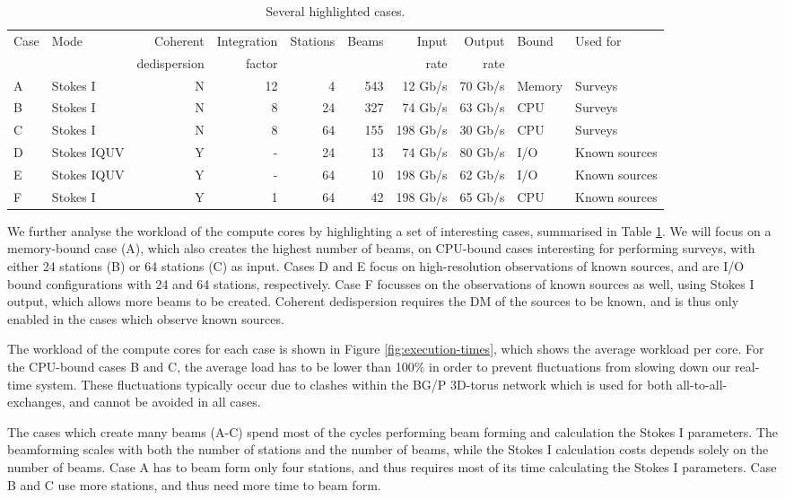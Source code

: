 \documentclass{llncs}
\begin{document}
\begin{table}
\begin{tabular}{l|l|r|r|r|r|r|r|l|l}
Case & Mode & Coherent     & Integration & Stations & Beams  & Input & Output & Bound & Used for \\
     &      & dedispersion & factor      &          &        & rate  & rate   &       & \\
\hline
\hline
A & Stokes I    & N & 12 &  4 & 543 &  12 Gb/s & 70 Gb/s & Memory & Surveys \\
B & Stokes I    & N &  8 & 24 & 327 &  74 Gb/s & 63 Gb/s & CPU   & Surveys \\
C & Stokes I    & N &  8 & 64 & 155 & 198 Gb/s & 30 Gb/s & CPU   & Surveys \\  
D & Stokes IQUV & Y & - & 24 &  13 &  74 Gb/s & 80 Gb/s & I/O   & Known sources \\
E & Stokes IQUV & Y & - & 64 &  10 & 198 Gb/s & 62 Gb/s & I/O   & Known sources \\
F & Stokes I    & Y & 1 & 64 &  42 & 198 Gb/s & 65 Gb/s & CPU   & Known sources 
\end{tabular}
\caption{Several highlighted cases.}
\label{table:cases}
\end{table}

We further analyse the workload of the compute cores by highlighting a set of interesting cases, summarised in Table \ref{table:cases}. We will focus on a memory-bound case (A), which also creates the highest number of beams, on CPU-bound cases interesting for performing surveys, with either 24 stations (B) or 64 stations (C) as input. Cases D and E focus on high-resolution observations of known sources, and are I/O bound configurations with 24 and 64 stations, respectively. Case F focusses on the observations of known sources as well, using Stokes I output, which allows more beams to be created. Coherent dedispersion requires the DM of the sources to be known, and is thus only enabled in the cases which observe known sources.

The workload of the compute cores for each case is shown in Figure \ref{fig:execution-times}, which shows the average workload per core. For the CPU-bound cases B and C, the average load has to be lower than 100\% in order to prevent fluctuations from slowing down our real-time system. These fluctuations typically occur due to clashes within the BG/P 3D-torus network which is used for both all-to-all-exchanges, and cannot be avoided in all cases.

The cases which create many beams (A-C) spend most of the cycles performing beam forming and calculation the Stokes I parameters. The beamforming scales with both the number of stations and the number of beams, while the Stokes I calculation costs depends solely on the number of beams. Case A has to beam form only four stations, and thus requires most of its time calculating the Stokes I parameters. Case B and C use more stations, and thus need more time to beam form.
\end{document}
